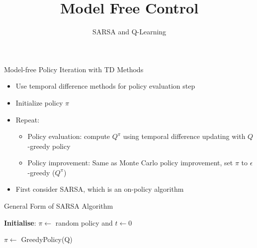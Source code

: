 \documentclass[aspectratio=169]{../latex_main/tntbeamer}  %
\title[RL: Model Free Control]{Model Free Control}
\subtitle{SARSA and Q-Learning}
\begin{document}
	
	\maketitle

\begin{frame}[c]{Model-free Policy Iteration with TD Methods}
	
	\begin{itemize}
		\item Use temporal difference methods for policy evaluation step
		\item Initialize policy $\pi$
		\item Repeat:
		\begin{itemize}
			\item Policy evaluation: compute $Q^\pi$ using temporal difference updating
			with $Q$-greedy policy
			\item Policy improvement: Same as Monte Carlo policy improvement, set $\pi$
			to $\epsilon$-greedy ($Q^\pi$)
		\end{itemize}
		\item First consider SARSA, which is an on-policy algorithm
	\end{itemize}
	
\end{frame}
\begin{frame}[c]{General Form of SARSA Algorithm}
	
	\begin{algorithm}[H]
        \caption{SARSA}
        \DontPrintSemicolon
        \LinesNotNumbered
        \textbf{Initialise}: $\pi \gets$ random policy and $t \gets 0$
    
        
        $\pi \gets$ GreedyPolicy(Q)
        
    \end{algorithm}
	
\end{frame}
\end{document}

